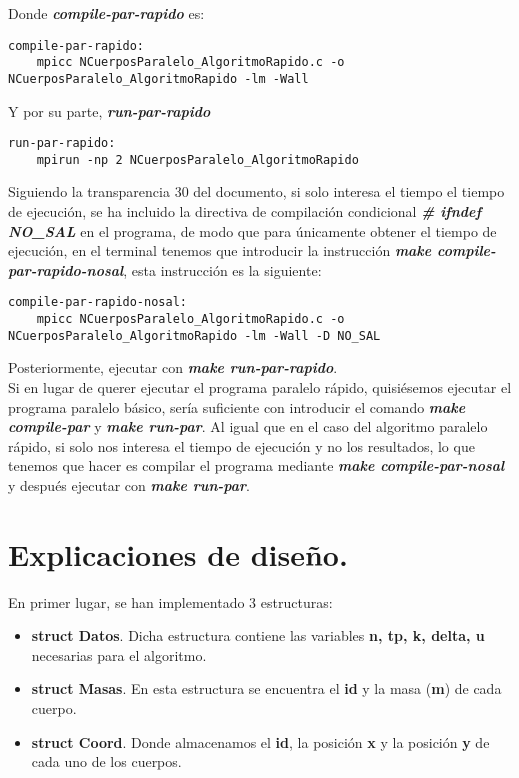 \documentclass[11pt]{article}
\begin{document}
Donde \textbf{\textit{compile-par-rapido}} es:

\begin{lstlisting}[style=C, numbers=none]
compile-par-rapido:
	mpicc NCuerposParalelo_AlgoritmoRapido.c -o NCuerposParalelo_AlgoritmoRapido -lm -Wall
\end{lstlisting}

Y por su parte, \textbf{\textit{run-par-rapido}}
\begin{lstlisting}[style=C,numbers=none]
run-par-rapido:
	mpirun -np 2 NCuerposParalelo_AlgoritmoRapido
\end{lstlisting}


Siguiendo la transparencia 30 del documento, si solo interesa el tiempo el tiempo de ejecución, se ha incluido la directiva de compilación condicional \textbf{\textit{\# ifndef NO\_SAL}} en el programa, de modo que para únicamente obtener el tiempo de ejecución, en el terminal tenemos que introducir la instrucción \textbf{\textit{make compile-par-rapido-nosal}}, esta instrucción es la siguiente:

\begin{lstlisting}[style=C,numbers=none]
compile-par-rapido-nosal:
	mpicc NCuerposParalelo_AlgoritmoRapido.c -o NCuerposParalelo_AlgoritmoRapido -lm -Wall -D NO_SAL
\end{lstlisting}

Posteriormente, ejecutar con \textbf{\textit{make run-par-rapido}}.\\ 

Si en lugar de querer ejecutar el programa paralelo rápido, quisiésemos ejecutar el programa paralelo básico, sería suficiente con introducir el comando \textbf{\textit{make compile-par}} y \textbf{\textit{make run-par}}. Al igual que en el caso del algoritmo paralelo rápido, si solo nos interesa el tiempo de ejecución y no los resultados, lo que tenemos que hacer es compilar el programa mediante \textbf{\textit{make compile-par-nosal}} y después ejecutar con \textbf{\textit{make run-par}}.

\section{Explicaciones de diseño.}
En primer lugar, se han implementado 3 estructuras:
\begin{itemize}
	\item \textbf{struct Datos}. Dicha estructura contiene las variables \textbf{n, tp, k, delta, u} necesarias para el algoritmo.
	
	\item \textbf{struct Masas}. En esta estructura se encuentra el \textbf{id} y la masa (\textbf{m}) de cada cuerpo.
	
	\item \textbf{struct Coord}. Donde almacenamos el \textbf{id}, la posición \textbf{x} y la posición \textbf{y} de cada uno de los cuerpos.
\end{itemize}
\end{document}

